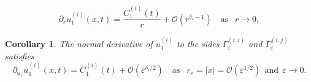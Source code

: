 \documentclass[10pt,a4paper]{amsart}
\newtheorem{corollary}{Corollary}
\begin{document}
		\begin{equation}\label{asym-deriv-r}
			\partial_r u^{(i)}_1(x,t)
			= \frac{C^{(i)}_1(t)}{r}
			+ \mathcal{O}\!\left(r^{\delta_i-1}\right)
			\quad \text{as } \ \ r\to 0,
		\end{equation}

	\begin{corollary}\label{corollarity-2-3}
		The normal derivative of $u^{(i)}_1$ to the sides $\Gamma_\varepsilon^{(i,i)}$ and $\Gamma_\varepsilon^{(i,j)}$ satisfies
		\begin{equation}\label{asym-normal-line-final}
			\partial_{\boldsymbol{\nu}_\varepsilon} u^{(i)}_1(x,t)
			= C^{(i)}_1(t)
			+ \mathcal{O}\!\left(\varepsilon^{\delta_i/2}\right)
			\quad \text{as } \ \ r_\varepsilon = |x| = \mathcal{O}\!\left(\varepsilon^{1/2}\right) \ \ \text{and} \ \ \varepsilon\to 0.
		\end{equation}
	\end{corollary}
\end{document}
